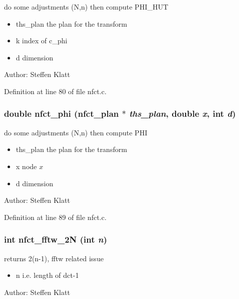do some adjustments (N,n) then compute PHI\_\-HUT 

\begin{itemize}
\item ths\_\-plan the plan for the transform \item k index of c\_\-phi \item d dimension\end{itemize}
\begin{Desc}
\item[Author:]Steffen Klatt \end{Desc}


Definition at line 80 of file nfct.c.\hypertarget{group__nfsct_g825ccf26ddeddc330f320146d3d223de}{
\subsubsection{\setlength{\rightskip}{0pt plus 5cm}double nfct\_\-phi ({\bf nfct\_\-plan} $\ast$ {\em ths\_\-plan}, double {\em x}, int {\em d})}}
\label{group__nfsct_g825ccf26ddeddc330f320146d3d223de}


do some adjustments (N,n) then compute PHI 

\begin{itemize}
\item ths\_\-plan the plan for the transform \item x node $x$ \item d dimension\end{itemize}
\begin{Desc}
\item[Author:]Steffen Klatt \end{Desc}


Definition at line 89 of file nfct.c.\hypertarget{group__nfsct_gf8091eb47eeeae93a156ac83c98dc638}{
\subsubsection{\setlength{\rightskip}{0pt plus 5cm}int nfct\_\-fftw\_\-2N (int {\em n})}}
\label{group__nfsct_gf8091eb47eeeae93a156ac83c98dc638}


returns 2(n-1), fftw related issue 

\begin{itemize}
\item n i.e. length of dct-1\end{itemize}
\begin{Desc}
\item[Author:]Steffen Klatt \end{Desc}


